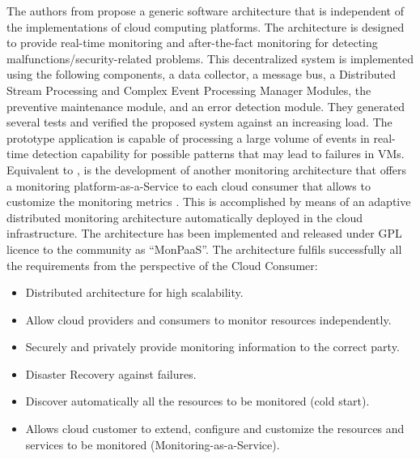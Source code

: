 \noindent
The authors from \cite{aktas2018hybrid} propose a generic software architecture that is independent of the implementations of cloud computing platforms. The architecture is designed to provide real-time monitoring and after-the-fact monitoring for detecting malfunctions/security-related problems. This decentralized system is implemented using the following components, a data collector, a message bus, a Distributed Stream Processing and Complex Event Processing Manager Modules, the preventive maintenance module, and an error detection module. They generated several tests and verified the proposed system against an increasing load. The prototype application is capable of processing a large volume of events in real-time detection capability for possible patterns that may lead to failures in VMs.\\

Equivalent to \cite{aktas2018hybrid}, is the development of another monitoring architecture that offers a monitoring platform-as-a-Service to each cloud consumer that allows to customize the monitoring metrics \cite{calero2014monpaas}. This is accomplished by means of an adaptive distributed monitoring architecture automatically deployed in the cloud infrastructure. The architecture has been implemented and released under GPL licence to the community as ``MonPaaS''. The architecture fulfils successfully all the requirements from the perspective of the Cloud Consumer:
\begin{itemize}
    \item Distributed architecture for high scalability.
    \item Allow cloud providers and consumers to monitor resources independently.
    \item Securely and privately provide monitoring information to the correct party.
    \item Disaster Recovery against failures.
    \item Discover automatically all the resources to be monitored (cold start).
    \item Allows cloud customer to extend, configure and customize the resources and services to be monitored (Monitoring-as-a-Service).
\end{itemize}


